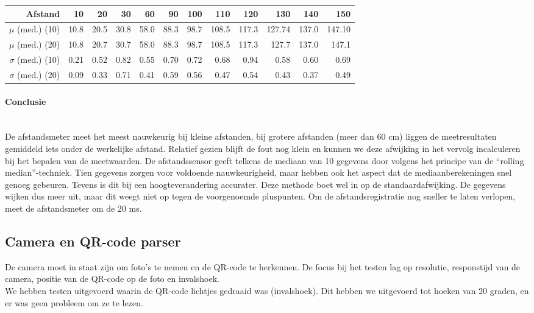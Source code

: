 \documentclass[eind]{penoverslag}
\begin{document}
\begin{tabular}{r||r|r|r|r|r|r|r|r|r|r|r}
\textbf{Afstand} & 10 & 20 & 30 & 60 & 90 & 100 & 110 & 120 & 130 & 140 & 150 \\
\hline \hline 
$\mu$ (med.) (10) & 10.8 & 20.5 & 30.8 & 58.0 & 88.3 & 98.7 & 108.5 & 117.3 & 127.74 & 137.0 & 147.10 \\
$\mu$ (med.) (20) & 10.8 & 20.7 & 30.7 & 58.0 & 88.3 & 98.7 & 108.5 & 117.3 & 127.7 & 137.0 & 147.1 \\
$\sigma$ (med.) (10) & 0.21 & 0.52 & 0.82 & 0.55 & 0.70 & 0.72 & 0.68 & 0.94 & 0.58 & 0.60 & 0.69 \\
$\sigma$ (med.) (20)& 0.09 & 0.33 & 0.71 & 0.41 & 0.59 & 0.56 & 0.47 & 0.54 & 0.43 & 0.37 & 0.49 \\
\end{tabular}

\paragraph{Conclusie} ~\\ 
De afstandsmeter meet het meest nauwkeurig bij kleine afstanden, bij grotere afstanden (meer dan 60 cm) liggen de meetresultaten gemiddeld iets onder de werkelijke afstand. Relatief gezien blijft de fout nog klein en kunnen we deze afwijking in het vervolg incalculeren bij het bepalen van de meetwaarden. De afstandssensor geeft telkens de mediaan van 10 gegevens door volgens het principe van de “rolling median”-techniek. Tien gegevens zorgen voor voldoende nauwkeurigheid, maar hebben ook het aspect dat de mediaanberekeningen snel genoeg gebeuren. Tevens is dit bij een hoogteverandering accurater. Deze methode boet wel in op de standaardafwijking. De gegevens wijken dus meer uit, maar dit weegt niet op tegen de voorgenoemde pluspunten. Om de afstandsregistratie nog sneller te laten verlopen, meet de afstandsmeter om de 20 ms.

\subsection{Camera en QR-code parser}
De camera moet in staat zijn om foto's te nemen en de QR-code te herkennen. De focus bij het testen lag op resolutie, responstijd van de camera, positie van de QR-code op de foto en invalshoek. \\

We hebben testen uitgevoerd waarin de QR-code lichtjes gedraaid was (invalshoek). Dit hebben we uitgevoerd tot hoeken van 20 graden, en er was geen probleem om ze te lezen. \\
\end{document}
